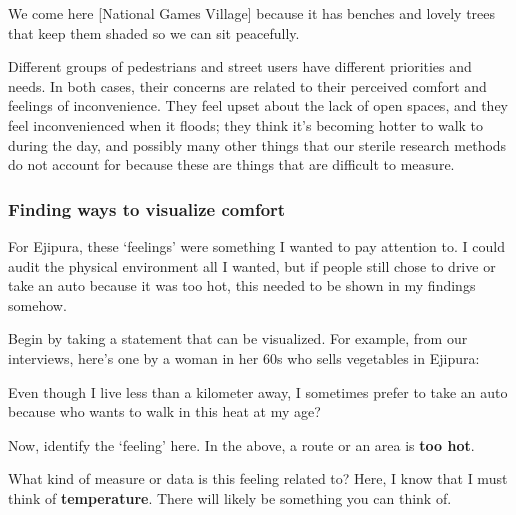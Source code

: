 \documentclass[
]{latex/krantz}
\renewenvironment{quote}{\begin{VF}}{\end{VF}}
\begin{document}
\begin{quote}
We come here {[}National Games Village{]} because it has benches and lovely trees that keep them shaded so we can sit peacefully.
\end{quote}

Different groups of pedestrians and street users have different priorities and needs. In both cases, their concerns are related to their perceived comfort and feelings of inconvenience. They feel upset about the lack of open spaces, and they feel inconvenienced when it floods; they think it's becoming hotter to walk to during the day, and possibly many other things that our sterile research methods do not account for because these are things that are difficult to measure.

\hypertarget{finding-ways-to-visualize-comfort}{%
\subsubsection{Finding ways to visualize comfort}\label{finding-ways-to-visualize-comfort}}

For Ejipura, these `feelings' were something I wanted to pay attention to. I could audit the physical environment all I wanted, but if people still chose to drive or take an auto because it was too hot, this needed to be shown in my findings somehow.

Begin by taking a statement that can be visualized. For example, from our interviews, here's one by a woman in her 60s who sells vegetables in Ejipura:

\begin{quote}
Even though I live less than a kilometer away, I sometimes prefer to take an auto because who wants to walk in this heat at my age?
\end{quote}

Now, identify the `feeling' here. In the above, a route or an area is \textbf{too hot}.

What kind of measure or data is this feeling related to? Here, I know that I must think of \textbf{temperature}. There will likely be something you can think of.
\end{document}

